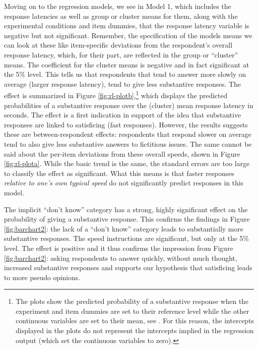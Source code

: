 \documentclass[Royal,times,sageh]{sagej}
\begin{document}
Moving on to the regression models, we see in Model 1, which includes
the response latencies as well as group or cluster means for them, along
with the experimental conditions and item dummies, that the response
latency variable is negative but not significant. Remember, the
specification of the models means we can look at these like
item-specific deviations from the respondent's overall response latency,
which, for their part, are reflected in the group or ``cluster'' means.
The coefficient for the cluster means is negative and in fact
significant at the 5\% level. This tells us that respondents that tend
to answer more slowly on average (larger response latency), tend to give
less substantive responses. The effect is summarized in Figure
\ref{fig:rl-plotb},\footnote{The plots show the predicted probability of
  a substantive response when the experiment and item dummies are set to
  their reference level while the other continuous variables are set to
  their mean, see \citet{Luedecke2021}. For this reason, the intercepts
  displayed in the plots do not represent the intercepts implied in the
  regression output (which set the continuous variables to zero).} which
displays the predicted probabilities of a substantive response over the
(cluster) mean response latency in seconds. The effect is a first
indication in support of the idea that substantive responses are linked
to satisficing (fast responses). However, the results suggests these are
between-respondent effects: respondents that respond slower on average
tend to also give less substantive answers to fictitious issues. The
same cannot be said about the per-item deviations from these overall
speeds, shown in Figure \ref{fig:rl-plota}. While the basic trend is the
same, the standard errors are too large to classify the effect as
significant. What this means is that faster responses
\textit{relative to one's own typical speed} do not significantly
predict responses in this model.

The implicit ``don't know'' category has a strong, highly significant
effect on the probability of giving a substantive response. This
confirms the findings in Figure \ref{fig:barchart2}: the lack of a
``don't know'' category leads to substantially more substantive
responses. The speed instructions are significant, but only at the 5\%
level. The effect is positive and it thus confirms the impression from
Figure \ref{fig:barchart2}: asking respondents to answer quickly,
without much thought, increased substantive responses and supports our
hypothesis that satisficing leads to more pseudo opinions.
\end{document}
